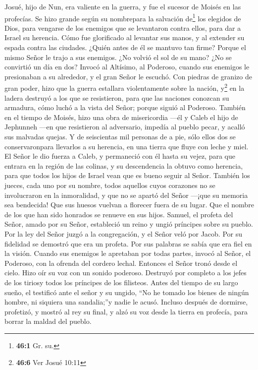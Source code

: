  Josué, hijo de Nun, era valiente en la guerra, y fue el
sucesor de Moisés en las profecías. Se hizo grande según su nombrepara
la salvación de\footnote{\textbf{46:1} Gr. su.} los elegidos de Dios,
para vengarse de los enemigos que se levantaron contra ellos, para dar a
Israel su herencia.  Cómo fue glorificado al levantar sus
manos, y al extender su espada contra las ciudades. 
¿Quién antes de él se mantuvo tan firme? Porque el mismo Señor le trajo
a sus enemigos.  ¿No volvió el sol de su mano? ¿No se
convirtió un día en dos?  Invocó al Altísimo, al Poderoso,
cuando sus enemigos le presionaban a su alrededor, y el gran Señor le
escuchó.  Con piedras de granizo de gran poder, hizo que
la guerra estallara violentamente sobre la nación, y\footnote{\textbf{46:6}
  Ver Josué 10:11} en la ladera destruyó a los que se resistieron, para
que las naciones conozcan su armadura, cómo luchó a la vista del Señor;
porque siguió al Poderoso.  También en el tiempo de
Moisés, hizo una obra de misericordia ---él y Caleb el hijo de Jephunneh
---en que resistieron al adversario, impedía al pueblo pecar, y acalló
sus malvadas quejas.  Y de seiscientas mil personas de a
pie, sólo ellos dos se conservaronpara llevarlos a su herencia, en una
tierra que fluye con leche y miel.  El Señor le dio fuerza
a Caleb, y permaneció con él hasta su vejez, para que entrara en la
región de las colinas, y su descendencia la obtuvo como herencia,
 para que todos los hijos de Israel vean que es bueno
seguir al Señor.  También los jueces, cada uno por su
nombre, todos aquellos cuyos corazones no se involucraron en la
inmoralidad, y que no se apartó del Señor ---¡que su memoria sea
bendecida!  Que sus huesos vuelvan a florecer fuera de su
lugar. Que el nombre de los que han sido honrados se renueve en sus
hijos.  Samuel, el profeta del Señor, amado por su Señor,
estableció un reino y ungió príncipes sobre su pueblo. 
Por la ley del Señor juzgó a la congregación, y el Señor veló por Jacob.
 Por su fidelidad se demostró que era un profeta. Por sus
palabras se sabía que era fiel en la visión.  Cuando sus
enemigos le apretaban por todas partes, invocó al Señor, el Poderoso,
con la ofrenda del cordero lechal.  Entonces el Señor
tronó desde el cielo. Hizo oír su voz con un sonido poderoso.
 Destruyó por completo a los jefes de los tiriosy todos
los príncipes de los filisteos.  Antes del tiempo de su
largo sueño, el testificó ante el señor y su ungido, ``No he tomado los
bienes de ningún hombre, ni siquiera una sandalia;''y nadie le acusó.
 Incluso después de dormirse, profetizó, y mostró al rey
su final, y alzó su voz desde la tierra en profecía, para borrar la
maldad del pueblo.

